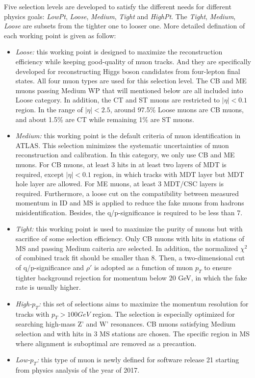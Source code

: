 Five selection levels are developed to satisfy the different needs for different physics goals: \textit{LowPt}, \textit{Loose}, \textit{Medium}, \textit{Tight} and \textit{HighPt}.
The \textit{Tight}, \textit{Medium}, \textit{Loose} are subsets from the tighter one to looser one.
More detailed defination of each working point is given as follow:
\begin{itemize}
	\item \textit{Loose:} this working point is designed to maximize the reconstruction efficiency while keeping good-quality of muon tracks. And they are specifically developed for reconstructing Higgs boson candidates from four-lepton final states. All four muon types are used for this selection level. The CB and ME muons passing Medium WP that will mentioned below are all included into Loose category. In addition, the CT and ST muons are restricted to $|\eta| < 0.1$ region.
In the range of $|\eta| < 2.5$, around 97.5\% Loose muons are CB muons, and about 1.5\% are CT while remaining 1\% are ST muons.
	\item \textit{Medium:} this working point is the default criteria of muon identification in ATLAS. This selection minimizes the systematic uncertainties of muon reconstruction and calibration. In this category, we only use CB and ME muons. For CB muons, at least 3 hits in at least two layers of MDT is required, except $|\eta| < 0.1$ region, in which tracks with  MDT layer but  MDT hole layer are allowed. For ME muons, at least 3 MDT/CSC layers is required.
Furthermore, a loose cut on the compatibility between measured momentum in ID and MS is applied to reduce the fake muons from hadrons misidentification. Besides, the q/p-significance is required to be less than 7.
	\item \textit{Tight:} this working point is used to maximize the purity of muons but with sacrifice of some selection efficiency. Only CB muons with hits in  stations of MS and passing Medium caiteria are selected.
In addition, the normalized $\chi^{2}$ of combined track fit should be smaller than 8. Then, a two-dimensional cut of q/p-significance and $\rho'$ is adopted as a function of muon $p_{T}$ to ensure tighter background rejection for momentum below 20 GeV, in which the fake rate is usually higher.
	\item \textit{High-$p_{T}$:} this set of selections aims to maximize the momentum resolution for tracks with $p_{T} > 100 GeV$ region. The selection is especially optimized for searching high-mass Z' and W' resonances. CB muons satisfying Medium selection and with  hits in 3 MS stations are chosen. The specific region in MS where alignment is suboptimal are removed as a precaution.
	\item \textit{Low-$p_{T}$:} this type of muon is newly defined for software release 21 starting from physics analysis of the year of 2017.
\end{itemize}
